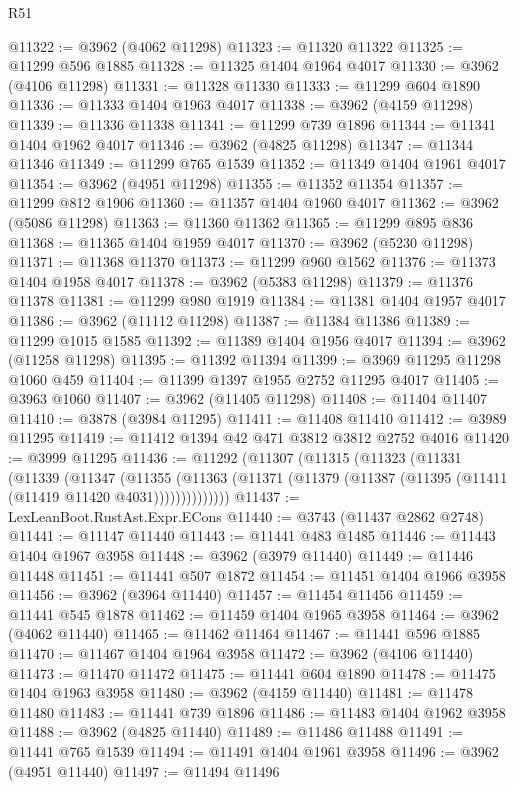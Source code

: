 \begin{lexlean}{R51}
\begin{coremodule}
@11322 := @3962 (@4062 @11298)
@11323 := @11320 @11322
@11325 := @11299 @596 @1885
@11328 := @11325 @1404 @1964 @4017
@11330 := @3962 (@4106 @11298)
@11331 := @11328 @11330
@11333 := @11299 @604 @1890
@11336 := @11333 @1404 @1963 @4017
@11338 := @3962 (@4159 @11298)
@11339 := @11336 @11338
@11341 := @11299 @739 @1896
@11344 := @11341 @1404 @1962 @4017
@11346 := @3962 (@4825 @11298)
@11347 := @11344 @11346
@11349 := @11299 @765 @1539
@11352 := @11349 @1404 @1961 @4017
@11354 := @3962 (@4951 @11298)
@11355 := @11352 @11354
@11357 := @11299 @812 @1906
@11360 := @11357 @1404 @1960 @4017
@11362 := @3962 (@5086 @11298)
@11363 := @11360 @11362
@11365 := @11299 @895 @836
@11368 := @11365 @1404 @1959 @4017
@11370 := @3962 (@5230 @11298)
@11371 := @11368 @11370
@11373 := @11299 @960 @1562
@11376 := @11373 @1404 @1958 @4017
@11378 := @3962 (@5383 @11298)
@11379 := @11376 @11378
@11381 := @11299 @980 @1919
@11384 := @11381 @1404 @1957 @4017
@11386 := @3962 (@11112 @11298)
@11387 := @11384 @11386
@11389 := @11299 @1015 @1585
@11392 := @11389 @1404 @1956 @4017
@11394 := @3962 (@11258 @11298)
@11395 := @11392 @11394
@11399 := @3969 @11295 @11298 @1060 @459
@11404 := @11399 @1397 @1955 @2752 @11295 @4017
@11405 := @3963 @1060
@11407 := @3962 (@11405 @11298)
@11408 := @11404 @11407
@11410 := @3878 (@3984 @11295)
@11411 := @11408 @11410
@11412 := @3989 @11295
@11419 := @11412 @1394 @42 @471 @3812 @3812 @2752 @4016
@11420 := @3999 @11295
@11436 := @11292
    (@11307
      (@11315
        (@11323
          (@11331
            (@11339
              (@11347
                (@11355
                  (@11363 (@11371 (@11379 (@11387 (@11395 (@11411 (@11419 @11420 @4031))))))))))))))
@11437 := LexLeanBoot.RustAst.Expr.ECons
@11440 := @3743 (@11437 @2862 @2748)
@11441 := @11147 @11440
@11443 := @11441 @483 @1485
@11446 := @11443 @1404 @1967 @3958
@11448 := @3962 (@3979 @11440)
@11449 := @11446 @11448
@11451 := @11441 @507 @1872
@11454 := @11451 @1404 @1966 @3958
@11456 := @3962 (@3964 @11440)
@11457 := @11454 @11456
@11459 := @11441 @545 @1878
@11462 := @11459 @1404 @1965 @3958
@11464 := @3962 (@4062 @11440)
@11465 := @11462 @11464
@11467 := @11441 @596 @1885
@11470 := @11467 @1404 @1964 @3958
@11472 := @3962 (@4106 @11440)
@11473 := @11470 @11472
@11475 := @11441 @604 @1890
@11478 := @11475 @1404 @1963 @3958
@11480 := @3962 (@4159 @11440)
@11481 := @11478 @11480
@11483 := @11441 @739 @1896
@11486 := @11483 @1404 @1962 @3958
@11488 := @3962 (@4825 @11440)
@11489 := @11486 @11488
@11491 := @11441 @765 @1539
@11494 := @11491 @1404 @1961 @3958
@11496 := @3962 (@4951 @11440)
@11497 := @11494 @11496

\end{coremodule}
\end{lexlean}
